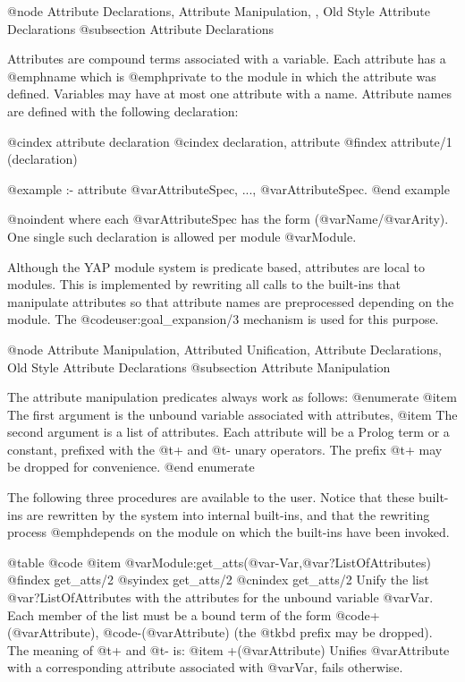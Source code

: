 {{{{{{{{{@node Attribute Declarations, Attribute Manipulation, , Old Style Attribute Declarations
@subsection Attribute Declarations

Attributes are compound terms associated with a variable. Each attribute
has a @emph{name} which is @emph{private} to the module in which the
attribute was defined. Variables may have at most one attribute with a
name. Attribute names are defined with the following declaration:

@cindex attribute declaration
@cindex declaration, attribute
@findex attribute/1 (declaration)

@example
:- attribute @var{AttributeSpec}, ..., @var{AttributeSpec}.
@end example

@noindent
where each @var{AttributeSpec} has the form (@var{Name}/@var{Arity}).
One single such declaration is allowed per module @var{Module}.

Although the YAP module system is predicate based, attributes are local
to modules. This is implemented by rewriting all calls to the
built-ins that manipulate attributes so that attribute names are
preprocessed depending on the module.  The @code{user:goal_expansion/3}
mechanism is used for this purpose.


@node Attribute Manipulation, Attributed Unification, Attribute Declarations, Old Style Attribute Declarations
@subsection Attribute Manipulation


The  attribute manipulation predicates always work as follows:
@enumerate
@item The first argument is the unbound variable associated with
attributes,
@item The second argument is a list of attributes. Each attribute will
be a Prolog term or a constant, prefixed with the @t{+} and @t{-} unary
operators. The prefix @t{+} may be dropped for convenience.
@end enumerate

The following three procedures are available to the user. Notice that
these built-ins are rewritten by the system into internal built-ins, and
that the rewriting process @emph{depends} on the module on which the
built-ins have been invoked.

@table @code
@item @var{Module}:get_atts(@var{-Var},@var{?ListOfAttributes})
@findex get_atts/2
@syindex get_atts/2
@cnindex get_atts/2
Unify the list @var{?ListOfAttributes} with the attributes for the unbound
variable @var{Var}. Each member of the list must be a bound term of the
form @code{+(@var{Attribute})}, @code{-(@var{Attribute})} (the @t{kbd}
prefix may be dropped). The meaning of @t{+} and @t{-} is:
@item +(@var{Attribute})
Unifies @var{Attribute} with a corresponding attribute associated with
@var{Var}, fails otherwise.

}}}}}}}}}
